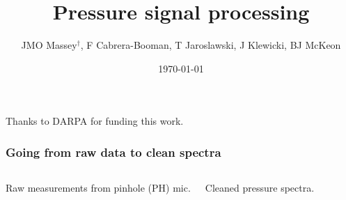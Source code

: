 \documentclass[aspectratio=169,10pt]{beamer}
\title{Pressure signal processing}
\author{JMO Massey$^{\dag}$, F Cabrera-Booman, T Jaroslawski, J Klewicki, BJ McKeon}
\institute{Center for Turbulence Research \\ Stanford University}
\date{\today}
\begin{document}
\begin{frame}
    \setcounter{framenumber}{0}
    \titlepage
    \vfill
    {\scriptsize \centering Thanks to DARPA for funding this work.\par}
\end{frame}

\begin{frame}
  \frametitle{Going from raw data to clean spectra}
  \begin{columns}[c] %
        Raw measurements from pinhole (PH) mic.
    
      \centering
      \scalebox{3}{$\Longrightarrow$}
        Cleaned pressure spectra.
    
  \end{columns}
\end{frame}
\end{document}
